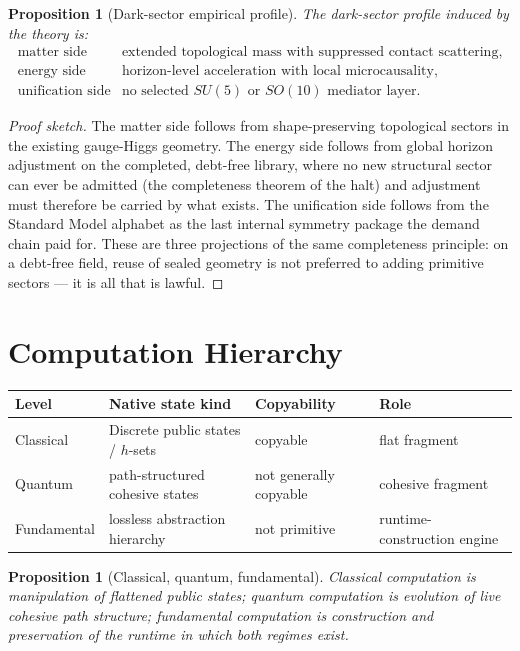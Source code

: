 \documentclass[11pt]{article}
\theoremstyle{plain}
\newtheorem{proposition}[theorem]{Proposition}
\theoremstyle{definition}
\theoremstyle{remark}
\newenvironment{proofsketch}{\begin{proof}[Proof sketch]}{\end{proof}}
\begin{document}
\begin{proposition}[Dark-sector empirical profile]
The dark-sector profile induced by the theory is:
\[
\begin{array}{ll}
\text{matter side} & \text{extended topological mass with suppressed contact scattering},\\
\text{energy side} & \text{horizon-level acceleration with local microcausality},\\
\text{unification side} & \text{no selected }SU(5)\text{ or }SO(10)\text{ mediator layer}.
\end{array}
\]
\end{proposition}

\begin{proofsketch}
The matter side follows from shape-preserving topological sectors in the existing gauge-Higgs geometry. The energy side follows from global horizon adjustment on the completed, debt-free library, where no new structural sector can ever be admitted (the completeness theorem of the halt) and adjustment must therefore be carried by what exists. The unification side follows from the Standard Model alphabet as the last internal symmetry package the demand chain paid for. These are three projections of the same completeness principle: on a debt-free field, reuse of sealed geometry is not preferred to adding primitive sectors --- it is all that is lawful.
\end{proofsketch}

\section{Computation Hierarchy}

\begin{center}
\begin{tabularx}{\textwidth}{l Y Y Y}
\toprule
Level & Native state kind & Copyability & Role \\
\midrule
Classical & Discrete public states / \(h\)-sets & copyable & flat fragment \\
Quantum & path-structured cohesive states & not generally copyable & cohesive fragment \\
Fundamental & lossless abstraction hierarchy & not primitive & runtime-construction engine \\
\bottomrule
\end{tabularx}
\end{center}

\begin{proposition}[Classical, quantum, fundamental]
Classical computation is manipulation of flattened public states; quantum computation is evolution of live cohesive path structure; fundamental computation is construction and preservation of the runtime in which both regimes exist.
\end{proposition}
\end{document}
